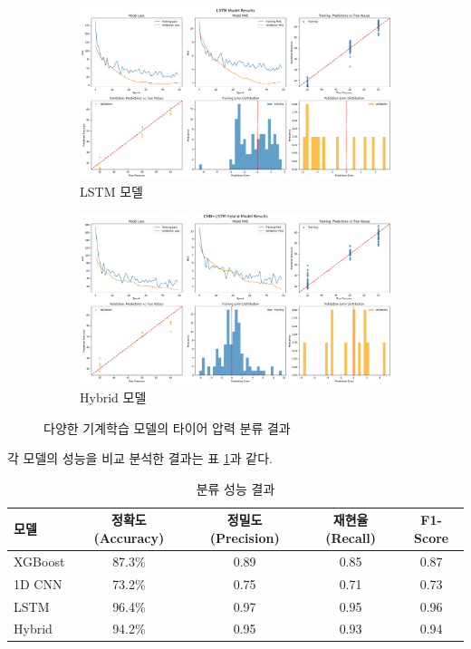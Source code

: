 \documentclass[12pt,a4paper]{article}
\begin{document}
\begin{figure}[H]
    \begin{subfigure}[b]{0.45\textwidth}
        \includegraphics[width=\textwidth]{images/LSTM.png}
        \caption{LSTM 모델}
        \label{fig:lstm_result}
    \end{subfigure}
    \hfill
    \begin{subfigure}[b]{0.45\textwidth}
        \includegraphics[width=\textwidth]{images/Hybrid.png}
        \caption{Hybrid 모델}
        \label{fig:hybrid_result}
    \end{subfigure}
    \caption{다양한 기계학습 모델의 타이어 압력 분류 결과}
    \label{fig:classification_results}
\end{figure}

각 모델의 성능을 비교 분석한 결과는 표 \ref{tab:classification_performance}과 같다.

\begin{table}[H]
    \centering
    \caption{분류 성능 결과}
    \label{tab:classification_performance}
    \begin{tabular}{@{}lcccc@{}}
        \toprule
        모델 & 정확도 (Accuracy) & 정밀도 (Precision) & 재현율 (Recall) & F1-Score \\
        \midrule
        XGBoost & 87.3\% & 0.89 & 0.85 & 0.87 \\
        1D CNN & 73.2\% & 0.75 & 0.71 & 0.73 \\
        LSTM & 96.4\% & 0.97 & 0.95 & 0.96 \\
        Hybrid & 94.2\% & 0.95 & 0.93 & 0.94 \\
        \bottomrule
    \end{tabular}
\end{table}
\end{document}
